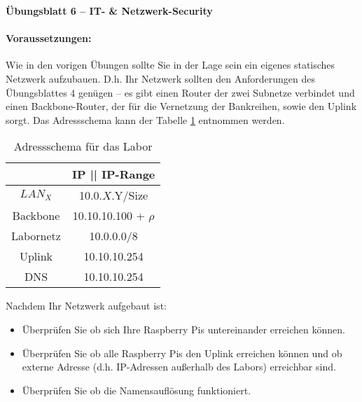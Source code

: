 \documentclass[paper=a4,fontsize=11pt]{scrartcl}%
\numberwithin{equation}{section}
\begin{document}
\begin{center}
\Large{\textbf{Übungsblatt 6 -- IT- \& Netzwerk-Security}}
\end{center}
\paragraph{Voraussetzungen:}
Wie in den vorigen Übungen sollte Sie in der Lage sein ein eigenes statisches Netzwerk aufzubauen. D.h. Ihr Netzwerk sollten den Anforderungen des Übungsblattes 4 genügen -- es gibt einen Router der zwei Subnetze verbindet und einen Backbone-Router, der für die Vernetzung der Bankreihen, sowie den Uplink sorgt. Das Adressschema kann der Tabelle \ref{adress_scheme} entnommen werden.
\begin{table}[H]
\caption{Adressschema für das Labor}
\label{adress_scheme}
\centering
\begin{tabular}{|c|c|}\hline
 & \textbf{IP  || IP-Range} \\ \hline
 $LAN_X$ & 10.0.$X$.Y/Size \\ \hline
 Backbone & 10.10.10.100 + $\rho$ \\ \hline
 Labornetz & 10.0.0.0/8 \\ \hline
 Uplink & 10.10.10.254 \\ \hline
 DNS & 10.10.10.254 \\ \hline
\end{tabular}
\end{table} 
Nachdem Ihr Netzwerk aufgebaut ist:
\begin{itemize}
	\item Überprüfen Sie ob sich Ihre Raspberry Pis untereinander erreichen können.
	\item Überprüfen Sie ob alle Raspberry Pis den Uplink erreichen können und ob externe Adresse (d.h. IP-Adressen außerhalb des Labors) erreichbar sind.
	\item Überprüfen Sie ob die Namensauflösung funktioniert.
\end{itemize}
\end{document}

